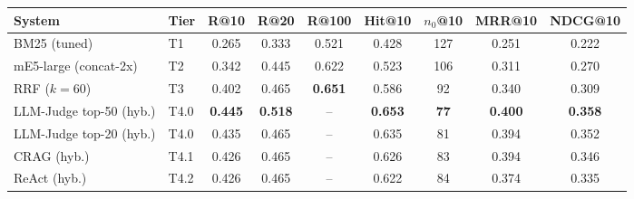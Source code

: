 \begin{tabular}{l l S[table-format=1.3] S[table-format=1.3] S[table-format=1.3] S[table-format=1.3] S[table-format=3] S[table-format=1.3] S[table-format=1.3]}
\toprule
System & Tier & {R@10} & {R@20} & {R@100} & {Hit@10} & {$n_{0}$@10} & {MRR@10} & {NDCG@10} \\
\midrule
BM25 (tuned) & T1 & 0.265 & 0.333 & 0.521 & 0.428 & 127 & 0.251 & 0.222 \\
\midrule
mE5-large (concat-2x) & T2 & 0.342 & 0.445 & 0.622 & 0.523 & 106 & 0.311 & 0.270 \\
\midrule
RRF ($k{=}60$) & T3 & 0.402 & 0.465 & {\textbf{0.651}} & 0.586 & 92 & 0.340 & 0.309 \\
\midrule
LLM-Judge top-50 (hyb.) & T4.0 & {\textbf{0.445}} & {\textbf{0.518}} & {--} & {\textbf{0.653}} & \textbf{77} & {\textbf{0.400}} & {\textbf{0.358}} \\
LLM-Judge top-20 (hyb.) & T4.0 & 0.435 & 0.465 & {--} & 0.635 & 81 & 0.394 & 0.352 \\
CRAG (hyb.) & T4.1 & 0.426 & 0.465 & {--} & 0.626 & 83 & 0.394 & 0.346 \\
ReAct (hyb.) & T4.2 & 0.426 & 0.465 & {--} & 0.622 & 84 & 0.374 & 0.335 \\
\bottomrule
\end{tabular}
